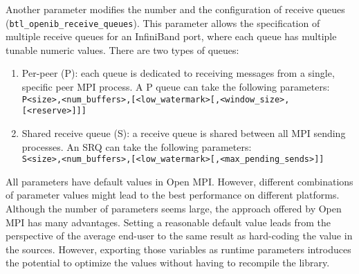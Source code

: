 Another parameter  modifies the number and the configuration of receive
queues ({\tt btl\_openib\_receive\_queues}). This parameter allows the
specification of multiple receive queues for an InfiniBand port, where
each queue has multiple tunable numeric values. There are two types of queues:
\begin{enumerate}
\item Per-peer (P): each queue is dedicated to receiving messages from a
  single, specific peer MPI process. A P queue can take the following
  parameters:\\
  {\tt P<size>,<num\_buffers>,[<low\_watermark>[,<window\_size>,} \\
  {\tt [<reserve>]]]}
\item Shared receive queue (S): a receive queue is shared between all MPI
  sending processes. An SRQ can take the following parameters: \\
  {\tt S<size>,<num\_buffers>,[<low\_watermark>[,<max\_pending\_sends>]]}
\end{enumerate}

All parameters have default values in Open MPI. However, different combinations of parameter values might lead to the best performance  on different platforms. Although the number of parameters seems large, the approach offered by Open MPI has many advantages. Setting a reasonable default value leads from the perspective of the average end-user to the same 
result as hard-coding the value in the sources. However, exporting those variables as runtime parameters introduces the potential to optimize the values without having to recompile the library.
